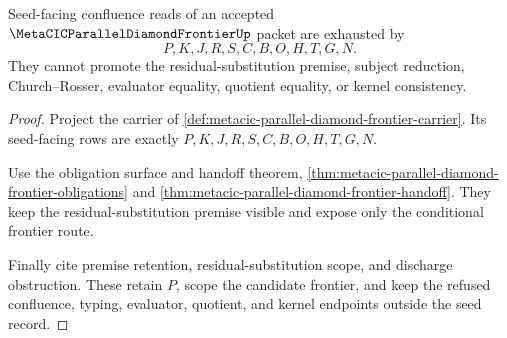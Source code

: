 \begin{theorem}
\label{thm:metacic-parallel-diamond-frontier-seed-record-exhaustion}
Seed-facing confluence reads of an accepted $\MetaCICParallelDiamondFrontierUp$ packet are exhausted by
$$
P,K,J,R,S,C,B,O,H,T,G,N .
$$
They cannot promote the residual-substitution premise, subject reduction, Church--Rosser, evaluator equality, quotient equality, or kernel consistency.
\end{theorem}
\begin{proof}
Project the carrier of \autoref{def:metacic-parallel-diamond-frontier-carrier}. Its seed-facing rows are exactly $P,K,J,R,S,C,B,O,H,T,G,N$.

Use the obligation surface and handoff theorem, \autoref{thm:metacic-parallel-diamond-frontier-obligations} and \autoref{thm:metacic-parallel-diamond-frontier-handoff}. They keep the residual-substitution premise visible and expose only the conditional frontier route.

Finally cite premise retention, residual-substitution scope, and discharge obstruction. These retain $P$, scope the candidate frontier, and keep the refused confluence, typing, evaluator, quotient, and kernel endpoints outside the seed record.
\end{proof}

